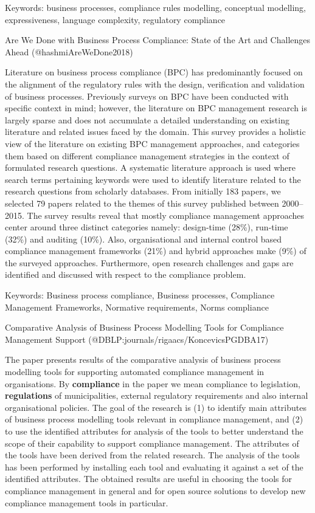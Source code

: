 \documentclass[
  letterpaper,
  DIV=11,
  numbers=noendperiod]{scrartcl}
\begin{document}
Keywords: business processes, compliance rules modelling, conceptual
modelling, expressiveness, language complexity, regulatory compliance

Are We Done with Business Process Compliance: State of the Art and
Challenges Ahead (@hashmiAreWeDone2018)

Literature on business process compliance (BPC) has predominantly
focused on the alignment of the regulatory rules with the design,
verification and validation of business processes. Previously surveys on
BPC have been conducted with specific context in mind; however, the
literature on BPC management research is largely sparse and does not
accumulate a detailed understanding on existing literature and related
issues faced by the domain. This survey provides a holistic view of the
literature on existing BPC management approaches, and categories them
based on different compliance management strategies in the context of
formulated research questions. A systematic literature approach is used
where search terms pertaining keywords were used to identify literature
related to the research questions from scholarly databases. From
initially 183 papers, we selected 79 papers related to the themes of
this survey published between 2000--2015. The survey results reveal that
mostly compliance management approaches center around three distinct
categories namely: design-time (28\%), run-time (32\%) and auditing
(10\%). Also, organisational and internal control based compliance
management frameworks (21\%) and hybrid approaches make (9\%) of the
surveyed approaches. Furthermore, open research challenges and gaps are
identified and discussed with respect to the compliance problem.

Keywords: Business process compliance, Business processes, Compliance
Management Frameworks, Normative requirements, Norms compliance

Comparative Analysis of Business Process Modelling Tools for Compliance
Management Support (@DBLP:journals/rigaacs/KoncevicsPGDBA17)

The paper presents results of the comparative analysis of business
process modelling tools for supporting automated compliance management
in organisations. By \textbf{compliance} in the paper we mean compliance
to legislation, \textbf{regulations} of municipalities, external
regulatory requirements and also internal organisational policies. The
goal of the research is (1) to identify main attributes of business
process modelling tools relevant in compliance management, and (2) to
use the identified attributes for analysis of the tools to better
understand the scope of their capability to support compliance
management. The attributes of the tools have been derived from the
related research. The analysis of the tools has been performed by
installing each tool and evaluating it against a set of the identified
attributes. The obtained results are useful in choosing the tools for
compliance management in general and for open source solutions to
develop new compliance management tools in particular.
\end{document}
